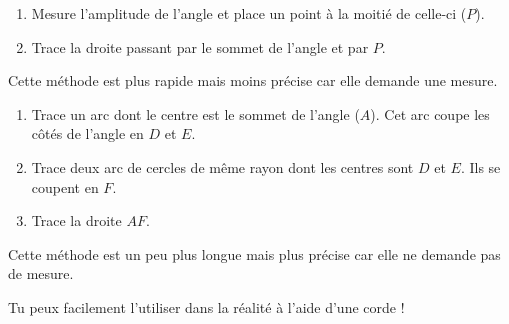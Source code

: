 \documentclass[../../syllabus_1.tex]{subfiles}
\begin{document}
\begin{tcolorbox}[title= Avec l'équerre, width=.49\linewidth,
        nobeforeafter,equal height group=A]
    \begin{minipage}[t][12cm]{\linewidth}
        \begin{enumerate}
            \item Mesure l'amplitude de l'angle et place un point à la moitié de celle-ci ($P$).
            \item Trace la droite passant par le sommet de l'angle et par $P$.
        \end{enumerate}
        \vfil
        \begin{center}
        \end{center}
    \end{minipage}
    \tcblower
    Cette méthode est plus rapide mais moins précise car elle demande une mesure.
\end{tcolorbox}
\hfill
\begin{tcolorbox}[title= Avec le compas, width=.49\linewidth, nobeforeafter,equal height group=A]
    \begin{minipage}[t][12cm]{\linewidth}
        \begin{enumerate}
            \item Trace un arc dont le centre est le sommet de l'angle ($A$). Cet arc
                  coupe les côtés de l'angle en $D$ et $E$.
            \item Trace deux arc de cercles de même rayon dont les centres sont
                  $D$ et $E$. Ils se coupent en $F$.
            \item Trace la droite $AF$.
        \end{enumerate}
        \vfil
        \begin{center}
        \end{center}
    \end{minipage}
    \tcblower
    Cette méthode est un peu plus longue mais plus précise car elle ne demande
    pas de mesure.

    Tu peux facilement l'utiliser dans la réalité à l'aide d'une corde !
\end{tcolorbox}
\end{document}

